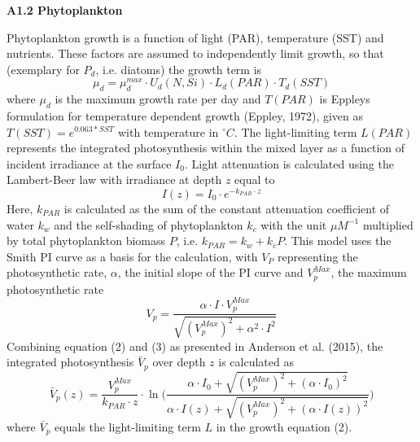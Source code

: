 {\bf {\large A1.2 Phytoplankton}}

Phytoplankton growth is a function of light (PAR), temperature (SST) and nutrients. These factors are assumed to independently limit growth, so that (exemplary for $P_{d}$, i.e. diatoms) the growth term is
\begin{equation}
\mu_{d} = \mu_{d}^{max} \cdot U_{d}(N,Si)\cdot L_{d}(PAR)\cdot T_{d}(SST)
\end{equation}
where $\mu_{d}$ is the maximum growth rate per day and $T(PAR)$ is Eppleys formulation for temperature dependent growth (Eppley, 1972), given as $T(SST) = e^{0.063 * SST}$ with temperature in $^\circ C$. The light-limiting term $L(PAR)$ represents the integrated photosynthesis within the mixed layer as a function of incident irradiance at the surface $I_0$. Light attenuation is calculated using the Lambert-Beer law with irradiance at depth $z$ equal to
\begin{equation}
I(z) = I_0 \cdot e^{-k_{PAR} \cdot z}
\end{equation}
Here, $k_{PAR}$ is calculated as the sum of the constant attenuation coefficient of water $k_w$ and the self-shading of phytoplankton $k_c$ with the unit $\mu M^{-1}$ multiplied by total phytoplankton biomass $P$, i.e. $k_{PAR} = k_w + k_c P$. This model uses the Smith PI curve as a basis for the calculation, with $V_P$ representing the photosynthetic rate, $\alpha$, the initial slope of the PI curve and $V_p^{Max}$, the maximum photosynthetic rate
\begin{equation}
V_p = \frac{\alpha \cdot I \cdot V_p^{Max}} {\sqrt{(V_p^{Max})^2 + \alpha^2 \cdot I^2}}
\end{equation}
Combining equation (2) and (3) as presented in Anderson et al. (2015), the integrated photosynthesis $\bar{V}_p$ over depth $z$ is calculated as
\begin{equation}
\bar{V}_p(z) = \frac{V_p^{Max}}{k_{PAR} \cdot z} \cdot \ln \Bigg( \frac{\alpha \cdot I_0 + \sqrt{(V_p^{Max})^2+(\alpha \cdot I_0)^2}} {\alpha \cdot I(z) + \sqrt{(V_p^{Max})^2+(\alpha \cdot I(z))^2}} \Bigg)
\end{equation}
where $\bar{V}_p$ equals the light-limiting term $L$ in the growth equation (2).

